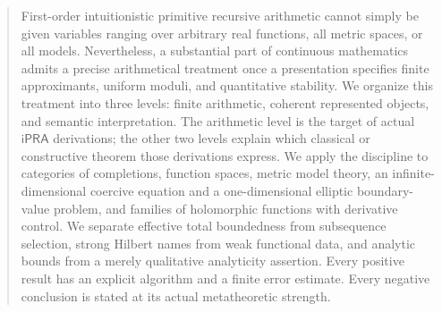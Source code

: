 \documentclass[11pt,oneside]{article}
\newcommand{\ipra}{\ensuremath{\mathsf{iPRA}}}
\theoremstyle{definition}
\theoremstyle{remark}
\begin{document}
\begin{abstract}
First-order intuitionistic primitive recursive arithmetic cannot simply be given
variables ranging over arbitrary real functions, all metric spaces, or all models.
Nevertheless, a substantial part of continuous mathematics admits a precise
arithmetical treatment once a presentation specifies finite approximants, uniform
moduli, and quantitative stability. We organize this treatment into three levels:
finite arithmetic, coherent represented objects, and semantic interpretation.
The arithmetic level is the target of actual \(\ipra\) derivations; the other two
levels explain which classical or constructive theorem those derivations express.
We apply the discipline to categories of completions, function spaces, metric model
theory, an infinite-dimensional coercive equation and a one-dimensional elliptic
boundary-value problem, and families of holomorphic functions with derivative
control. We separate effective total boundedness from subsequence selection,
strong Hilbert names from weak functional data, and analytic bounds from a merely
qualitative analyticity assertion. Every positive result has an explicit algorithm
and a finite error estimate. Every negative conclusion is stated at its actual
metatheoretic strength.
\end{abstract}
\tableofcontents
\newpage








\end{document}
